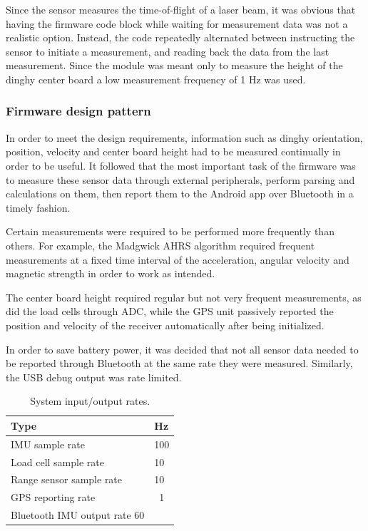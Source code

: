 Since the sensor measures the time-of-flight of a laser beam, it was obvious that having the firmware code block while waiting for measurement data was not a realistic option. Instead, the code repeatedly alternated between instructing the sensor to initiate a measurement, and reading back the data from the last measurement. Since the module was meant only to measure the height of the dinghy center board a low measurement frequency of 1 Hz was used.


\subsubsection{Firmware design pattern}
In order to meet the design requirements, information such as dinghy orientation, position, velocity and center board height had to be measured continually in order to be useful. It followed that the most important task of the firmware was to measure these sensor data through external peripherals, perform parsing and calculations on them, then report them to the Android app over Bluetooth in a timely fashion. 

Certain measurements were required to be performed more frequently than others. For example, the Madgwick AHRS algorithm required frequent measurements at a fixed time interval of the acceleration, angular velocity and magnetic strength in order to work as intended.

The center board height required regular but not very frequent measurements, as did the load cells through ADC, while the GPS unit passively reported the position and velocity of the receiver automatically after being initialized.

In order to save battery power, it was decided that not all sensor data needed to be reported through Bluetooth at the same rate they were measured. Similarly, the USB debug output was rate limited.





\begin{table}[H]
\centering
\begin{tabular}{ l | l }
  Type & Hz \\
  \hline
  IMU sample rate & 100 \\
  Load cell sample rate & 10 \\
  Range sensor sample rate & 10 \\
  GPS reporting rate & ~1 \\
  Bluetooth IMU output rate 60 \\
\end{tabular}
\caption{System input/output rates.}
\end{table}
